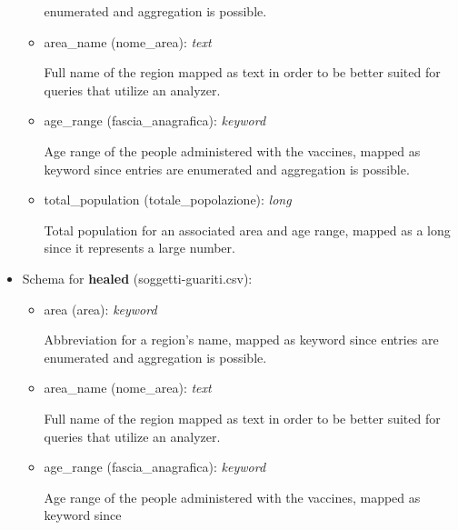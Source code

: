 \documentclass[12pt, a4paper]{article}
\begin{document}
\begin{itemize}
\begin{itemize}
\begin{footnotesize}
          enumerated and aggregation is possible.
        \end{footnotesize}
      \item area\_name (nome\_area): \emph{text} \\
        \begin{footnotesize}
          Full name of the region mapped as text in order to be better suited for queries
          that utilize an analyzer.
        \end{footnotesize}
      \item age\_range (fascia\_anagrafica): \emph{keyword} \\
        \begin{footnotesize}
          Age range of the people administered with the vaccines, mapped as keyword since
          entries are enumerated and aggregation is possible.
        \end{footnotesize}
      \item total\_population (totale\_popolazione): \emph{long} \\
        \begin{footnotesize}
          Total population for an associated area and age range, mapped as a long since 
          it represents a large number.
        \end{footnotesize}
    \end{itemize}
  \item Schema for \textbf{healed} (soggetti-guariti.csv):
    \begin{itemize}
      \item area (area): \emph{keyword} \\
        \begin{footnotesize}
          Abbreviation for a region's name, mapped as keyword since entries are 
          enumerated and aggregation is possible.
        \end{footnotesize}
      \item area\_name (nome\_area): \emph{text} \\
        \begin{footnotesize}
          Full name of the region mapped as text in order to be better suited for queries
          that utilize an analyzer.
        \end{footnotesize}
      \item age\_range (fascia\_anagrafica): \emph{keyword} \\
        \begin{footnotesize}
          Age range of the people administered with the vaccines, mapped as keyword since

\end{footnotesize}
\end{itemize}
\end{itemize}
\end{document}
